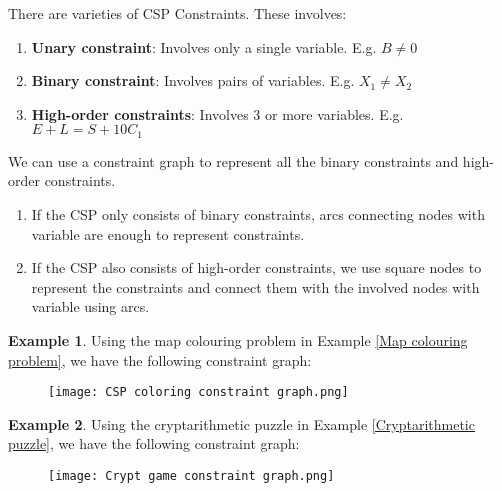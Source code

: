 \documentclass{article}
\theoremstyle{definition}
\newtheorem{example}{Example}[definition]
\begin{document}
\newpage
There are varieties of CSP Constraints. These involves:
\begin{enumerate}
	\item \textbf{Unary constraint}: Involves only a single variable. E.g. $B\neq 0$
	\item \textbf{Binary constraint}: Involves pairs of variables. E.g. $X_{1}\neq X_{2}$
	\item \textbf{High-order constraints}: Involves $3$ or more variables. E.g. $E+L=S+10C_{1}$
\end{enumerate}
We can use a constraint graph to represent all the binary constraints and high-order constraints.
\begin{enumerate}
	\item If the CSP only consists of binary constraints, arcs connecting nodes with variable are enough to represent constraints.
	\item If the CSP also consists of high-order constraints, we use square nodes to represent the constraints and connect them with the involved nodes with variable using arcs.
\end{enumerate}
\begin{example}
	Using the map colouring problem in Example \ref{Map colouring problem}, we have the following constraint graph:
	\begin{figure}[h]
		\centering
		\texttt{[image: CSP coloring constraint graph.png]}
	\end{figure}
\end{example}
\begin{example}
	Using the cryptarithmetic puzzle in Example \ref{Cryptarithmetic puzzle}, we have the following constraint graph:
	\begin{figure}[h]
		\centering
		\texttt{[image: Crypt game constraint graph.png]}
	\end{figure}
\end{example}

\newpage
\end{document}
